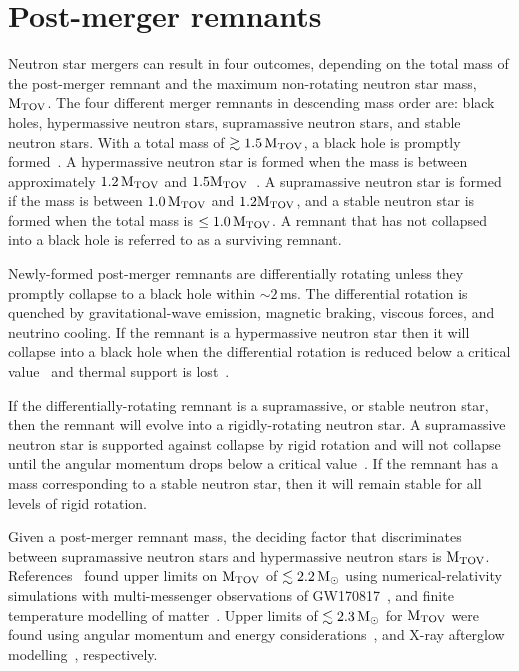 \documentclass[../Thesis.tex]{subfiles}
\begin{document}
 
    \section{Post-merger remnants} \label{sec:Intro:PMR}


    Neutron star mergers can result in four outcomes, depending on the total mass of the post-merger remnant and the maximum non-rotating neutron star mass, $\mathrm{M_{TOV}}$.
    The four different merger remnants in descending mass order are: black holes, hypermassive neutron stars, supramassive neutron stars, and stable neutron stars.
    With a total mass of $\gtrsim 1.5\,\mathrm{M_{TOV}}$, a black hole is promptly formed~\cite{Weih2018}.
    A hypermassive neutron star is formed when the mass is between approximately $1.2\,\mathrm{M_{TOV}}$ and $1.5\mathrm{M_{TOV}}$~\cite{Breu2016,Weih2018}.
    A supramassive neutron star is formed if the mass is between $1.0\,\mathrm{M_{TOV}}$ and $1.2\mathrm{M_{TOV}}$, and a stable neutron star is formed when the total mass is $\leq 1.0\,\mathrm{M_{TOV}}$.
    A remnant that has not collapsed into a black hole is referred to as a surviving remnant.\par
    
    Newly-formed post-merger remnants are differentially rotating unless they promptly collapse to a black hole within $\sim 2\,$ms.
    The differential rotation is quenched by gravitational-wave emission, magnetic braking, viscous forces, and neutrino cooling.
    If the remnant is a hypermassive neutron star then it will collapse into a black hole when the differential rotation is reduced below a critical value~\cite{Weih2018} and thermal support is lost~\cite[e.g.,][]{Bauswein2010,Kaplan2014}.  \par
    
    If the differentially-rotating remnant is a supramassive, or stable neutron star, then the remnant will evolve into a rigidly-rotating neutron star.
    A supramassive neutron star is supported against collapse by rigid rotation and will not collapse until the angular momentum drops below a critical value~\cite{Breu2016}.
    If the remnant has a mass corresponding to a stable neutron star, then it will remain stable for all levels of rigid rotation.\par
    
    Given a post-merger remnant mass, the deciding factor that discriminates between supramassive neutron stars and hypermassive neutron stars is $\mathrm{M_{TOV}}$.
    References~\cite{Margalit2017,Rezzolla2018,Khadkikar2021} found upper limits on $\mathrm{M_{TOV}}$ of $\lesssim 2.2\,\mathrm{M}_{\odot}$ using numerical-relativity simulations with multi-messenger observations of GW170817~\cite{Margalit2017,Rezzolla2018}, and finite temperature modelling of matter~\cite{Khadkikar2021}. 
    Upper limits of $\lesssim 2.3\,\mathrm{M}_{\odot}$ for $\mathrm{M_{TOV}}$ were found using angular momentum and energy considerations~\cite{Shibata2019}, and X-ray afterglow modelling~\cite{Sarin2020}, respectively. \par
\end{document}
